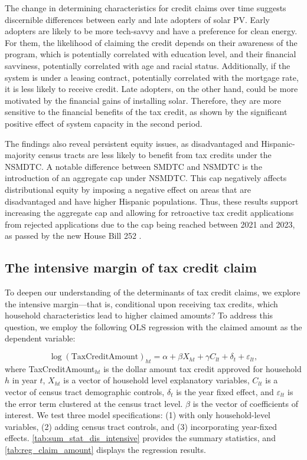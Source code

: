 \documentclass[12pt,twoside,letterpaper]{article}
\begin{document}
The change in determining characteristics for credit claims over time suggests discernible differences between early and late adopters of solar PV. Early adopters are likely to be more tech-savvy and have a preference for clean energy. For them, the likelihood of claiming the credit depends on their awareness of the program, which is potentially correlated with education level, and their financial savviness, potentially correlated with age and racial status. Additionally, if the system is under a leasing contract, potentially correlated with the mortgage rate, it is less likely to receive credit. Late adopters, on the other hand, could be more motivated by the financial gains of installing solar. Therefore, they are more sensitive to the financial benefits of the tax credit, as shown by the significant positive effect of system capacity in the second period.

The findings also reveal persistent equity issues, as disadvantaged and Hispanic-majority census tracts are less likely to benefit from tax credits under the NSMDTC. A notable difference between SMDTC and NSMDTC is the introduction of an aggregate cap under NSMDTC. This cap negatively affects distributional equity by imposing a negative effect on areas that are disadvantaged and have higher Hispanic populations. Thus, these results support increasing the aggregate cap and allowing for retroactive tax credit applications from rejected applications due to the cap being reached between 2021 and 2023, as passed by the new House Bill 252 \parencite{newsolarcap}. 

\subsection{The intensive margin of tax credit claim}

To deepen our understanding of the determinants of tax credit claims, we explore the intensive margin—that is, conditional upon receiving tax credits, which household characteristics lead to higher claimed amounts? To address this question, we employ the following OLS regression with the claimed amount as the dependent variable:

\begin{equation}\label{reg_4}
    \log(\text{TaxCreditAmount})_{ht} = \alpha + \beta X_{ht} + \gamma C_{lt}  + \delta_t + \varepsilon_{lt},
\end{equation}
where TaxCreditAmount$_{ht}$ is the dollar amount tax credit approved for household $h$ in year $t$, $X_{ht}$ is a vector of household level explanatory variables, $C_{lt}$ is a vector of census tract demographic controls, $\delta_t$ is the year fixed effect, and $\varepsilon_{lt}$ is the error term clustered at the census tract level. $\beta$ is the vector of coefficients of interest. We test three model specifications: (1) with only household-level variables, (2) adding census tract controls, and (3) incorporating year-fixed effects. \autoref{tab:sum_stat_dis_intensive} provides the summary statistics, and \autoref{tab:reg_claim_amount} displays the regression results.
\end{document}
